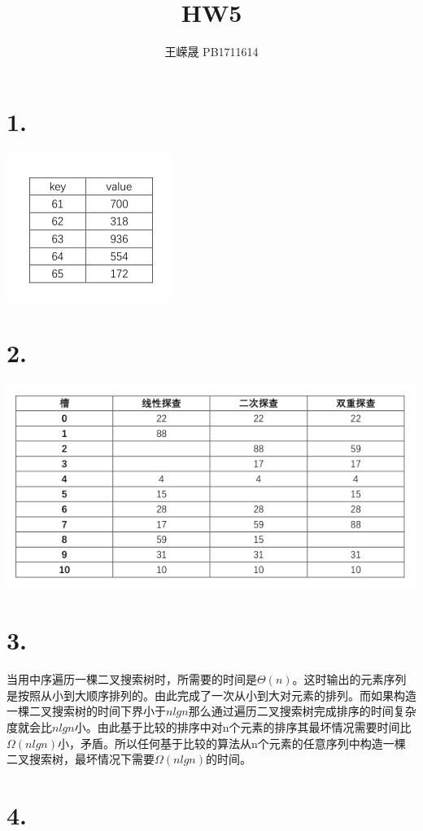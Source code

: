 \documentclass[UTF8]{ctexart}
\title{HW5}
\author{王嵘晟 \quad PB1711614}
\date{}
\begin{document}
	\maketitle
	\section*{1.}
	\includegraphics[scale=0.8]{1.png}
	\section*{2.}
	\includegraphics[scale=0.65]{2.png}
	\section*{3.}
	\par{当用中序遍历一棵二叉搜索树时，所需要的时间是$\Theta(n)$。这时输出的元素序列是按照从小到大顺序排列的。由此完成了一次从小到大对元素的排列。而如果构造一棵二叉搜索树的时间下界小于$nlgn$那么通过遍历二叉搜索树完成排序的时间复杂度就会比$nlgn$小。由此基于比较的排序中对n个元素的排序其最坏情况需要时间比$\Omega(nlgn)$小，矛盾。所以任何基于比较的算法从n个元素的任意序列中构造一棵二叉搜索树，最坏情况下需要$\Omega(nlgn)$的时间。}
	\section*{4.}
\end{document}
